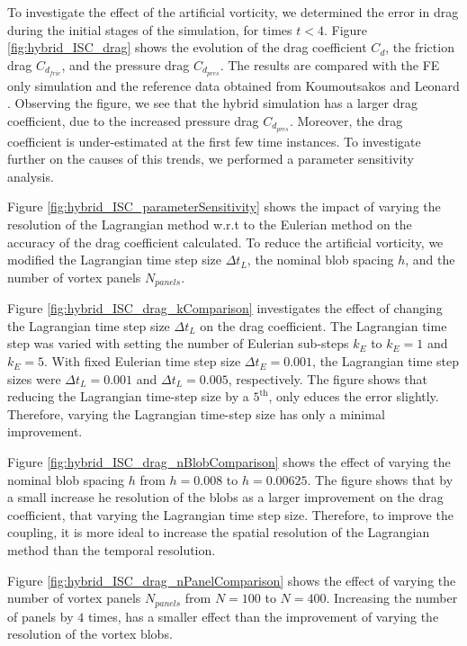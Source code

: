 To investigate the effect of the artificial vorticity, we determined the error in drag during the initial stages of the simulation, for times $t<4$. Figure \ref{fig:hybrid_ISC_drag} shows the evolution of the drag coefficient $C_d$, the friction drag $C_{d_{fric}}$, and the pressure drag $C_{d_{pres}}$. The results are compared with the FE only simulation and the reference data obtained from Koumoutsakos and Leonard \cite{Koumoutsakos1995a}. Observing the figure, we see that the hybrid simulation has a larger drag coefficient, due to the increased pressure drag $C_{d_{pres}}$. Moreover, the drag coefficient is under-estimated at the first few time instances. To investigate further on the causes of this trends, we performed a parameter sensitivity analysis. 

Figure \ref{fig:hybrid_ISC_parameterSensitivity} shows the impact of varying the resolution of the Lagrangian method w.r.t to the Eulerian method on the accuracy of the drag coefficient calculated. To reduce the artificial vorticity, we modified the Lagrangian time step size $\Delta t_L$, the nominal blob spacing $h$, and the number of vortex panels $N_{panels}$. 

Figure \ref{fig:hybrid_ISC_drag_kComparison} investigates the effect of changing the Lagrangian time step size $\Delta t_L$ on the drag coefficient. The Lagrangian time step was varied with setting the number of Eulerian sub-steps $k_E$ to $k_E=1$ and $k_E=5$. With fixed Eulerian time step size $\Delta t_E=0.001$, the Lagrangian time step sizes were $\Delta t_L = 0.001$ and $\Delta t_L=0.005$, respectively. The figure shows that reducing the Lagrangian time-step size by a $5^{\mathrm{th}}$, only educes the error slightly. Therefore, varying the Lagrangian time-step size has only a minimal improvement.

Figure \ref{fig:hybrid_ISC_drag_nBlobComparison} shows the effect of varying the nominal blob spacing $h$ from $h=0.008$ to $h=0.00625$. The figure shows that by a small increase he resolution of the blobs as a larger improvement on the drag coefficient, that varying the Lagrangian time step size. Therefore, to improve the coupling, it is more ideal to increase the spatial resolution of the Lagrangian method than the temporal resolution. 

Figure \ref{fig:hybrid_ISC_drag_nPanelComparison} shows the effect of varying the number of vortex panels $N_{panels}$ from $N=100$ to $N=400$. Increasing the number of panels by $4$ times, has a smaller effect than the improvement of varying the resolution of the vortex blobs.

